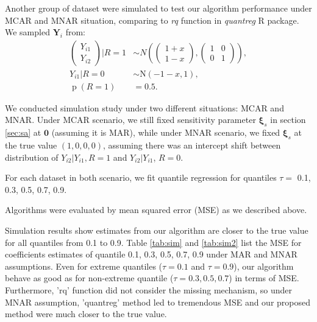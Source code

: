 \documentclass[12pt]{article}
\DeclareMathOperator{\pr}{p}
\begin{document}
Another group of dataset were simulated to test our algorithm
performance under MCAR and MNAR situation, comparing to \textit{rq}
function in \textit{quantreg} R package. We sampled $\bm Y_i$ from:
\begin{align*}
  \begin{pmatrix}
    Y_{i1}\\
    Y_{i2}
  \end{pmatrix}
  \Big |R = 1 & \sim N \left(
    \begin{pmatrix}
      1 + x\\
      1 - x
    \end{pmatrix},
    \begin{pmatrix}
      1& 0 \\
      0 & 1
    \end{pmatrix} \right), \\
  Y_{i1} | R = 0 & \sim \textrm{N}(-1-x, 1) , \\
  \pr (R = 1) & = 0.5.
\end{align*}

We conducted simulation study under two different situations: MCAR and
MNAR. Under MCAR scenario, we still fixed sensitivity parameter $\bm
\xi_s$ in section \ref{sec:sa} at $\bm 0$ (assuming it is MAR), while
under MNAR scenario, we fixed $\bm \xi_s$ at the true value $(1, 0, 0,
0)$, assuming there was an intercept shift between distribution of
$Y_{i2}|Y_{i1}, R = 1$ and $Y_{i2}|Y_{i1}$, $R = 0$.

For each dataset in both scenario, we fit quantile regression for
quantiles $\tau =$  0.1, 0.3, 0.5, 0.7, 0.9.

Algorithms were evaluated by mean squared error (MSE)
as we described above. 

Simulation results show estimates from our algorithm are closer to the
true value for all quantiles from 0.1 to 0.9. Table \ref{tab:sim} and
\ref{tab:sim2} list the MSE for coefficients estimates of quantile
0.1, 0.3, 0.5, 0.7, 0.9 under MAR and MNAR assumptions. Even for
extreme quantiles ($\tau = 0.1$ and $\tau = 0.9$), our algorithm
behave as good as for non-extreme quantile ($\tau = 0.3, 0.5, 0.7$) in
terms of MSE. Furthermore, 'rq' function did not consider the missing
mechanism, so under MNAR assumption, 'quantreg' method led to
tremendous MSE and our proposed method were much closer to the true
value.
\end{document}
